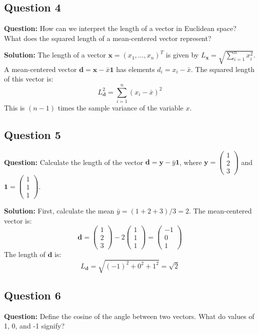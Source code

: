 \subsection*{Question 4}
\textbf{Question:} How can we interpret the length of a vector in Euclidean space? What does the squared length of a mean-centered vector represent?

\textbf{Solution:}
The length of a vector $\mathbf{x} = (x_1, ..., x_n)^T$ is given by $L_{\mathbf{x}} = \sqrt{\sum_{i=1}^n x_i^2}$.
A mean-centered vector $\mathbf{d} = \mathbf{x} - \bar{x}\mathbf{1}$ has elements $d_i = x_i - \bar{x}$. The squared length of this vector is:
$$ L_{\mathbf{d}}^2 = \sum_{i=1}^n (x_i - \bar{x})^2 $$
This is $(n-1)$ times the sample variance of the variable $x$.

\subsection*{Question 5}
\textbf{Question:} Calculate the length of the vector $\mathbf{d} = \mathbf{y} - \bar{y}\mathbf{1}$, where $\mathbf{y} = \begin{pmatrix} 1 \\ 2 \\ 3 \end{pmatrix}$ and $\mathbf{1} = \begin{pmatrix} 1 \\ 1 \\ 1 \end{pmatrix}$.

\textbf{Solution:}
First, calculate the mean $\bar{y} = (1+2+3)/3 = 2$.
The mean-centered vector is:
$$ \mathbf{d} = \begin{pmatrix} 1 \\ 2 \\ 3 \end{pmatrix} - 2 \begin{pmatrix} 1 \\ 1 \\ 1 \end{pmatrix} = \begin{pmatrix} -1 \\ 0 \\ 1 \end{pmatrix} $$
The length of $\mathbf{d}$ is:
$$ L_{\mathbf{d}} = \sqrt{(-1)^2 + 0^2 + 1^2} = \sqrt{2} $$

\subsection*{Question 6}
\textbf{Question:} Define the cosine of the angle between two vectors. What do values of 1, 0, and -1 signify?


